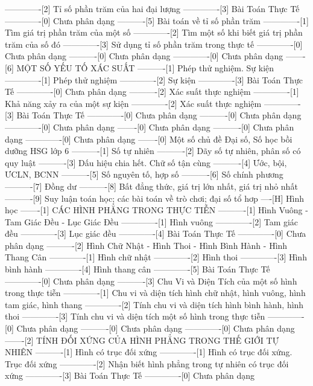 -------------[2] Tỉ số phần trăm của hai đại lượng
-------------[3] Bài Toán Thực Tế
-------------[0] Chưa phân dạng
----------[5] Bài toán về tỉ số phần trăm
-------------[1] Tìm giá trị phần trăm của một số
-------------[2] Tìm một số khi biết giá trị phần trăm của số đó
-------------[3] Sử dụng tỉ số phần trăm trong thực tế
-------------[0] Chưa phân dạng
----------[0] Chưa phân dạng
-------------[0] Chưa phân dạng
-------[6] MỘT SỐ YẾU TỐ XÁC SUẤT
----------[1] Phép thử nghiệm. Sự kiện
-------------[1] Phép thử nghiệm
-------------[2] Sự kiện
-------------[3] Bài Toán Thực Tế
-------------[0] Chưa phân dạng
----------[2] Xác suất thực nghiệm
-------------[1] Khả năng xảy ra của một sự kiện
-------------[2] Xác suất thực nghiệm
-------------[3] Bài Toán Thực Tế
-------------[0] Chưa phân dạng
----------[0] Chưa phân dạng
-------------[0] Chưa phân dạng
-------[0] Chưa phân dạng
----------[0] Chưa phân dạng
-------------[0] Chưa phân dạng
-------[0] Một số chủ đề Đại số, Số học bồi dưỡng HSG lớp 6
----------[1] Số tự nhiên
----------[2] Dãy số tự nhiên, phân số có quy luật
----------[3] Dấu hiệu chia hết. Chữ số tận cùng
----------[4] Ước, bội, ƯCLN, BCNN
----------[5] Số nguyên tố, hợp số
----------[6] Số chính phương
----------[7] Đồng dư
----------[8] Bất đẳng thức, giá trị lớn nhất, giá trị nhỏ nhất
----------[9] Suy luận toán học; các bài toán về trò chơi; đại số tổ hơp
----[H] Hình học
-------[1] CÁC HÌNH PHẲNG TRONG THỰC TIỄN
----------[1] Hình Vuông - Tam Giác Đều - Lục Giác Đều
-------------[1] Hình vuông
-------------[2] Tam giác đều
-------------[3] Lục giác đều
-------------[4] Bài Toán Thực Tế
-------------[0] Chưa phân dạng
----------[2] Hình Chữ Nhật - Hình Thoi - Hình Bình Hành - Hình Thang Cân
-------------[1] Hình chữ nhật
-------------[2] Hình thoi
-------------[3] Hình bình hành
-------------[4] Hình thang cân
-------------[5] Bài Toán Thực Tế
-------------[0] Chưa phân dạng
----------[3] Chu Vi và Diện Tích của một số hình trong thực tiễn
-------------[1] Chu vi và diện tích hình chữ nhật, hình vuông, hình tam giác, hình thang
-------------[2] Tính chu vi và diện tích hình bình hành, hình thoi
-------------[3] Tính chu vi và diện tích một số hình trong thực tiễn
-------------[0] Chưa phân dạng
----------[0] Chưa phân dạng
-------------[0] Chưa phân dạng
-------[2] TÍNH ĐỐI XỨNG CỦA HÌNH PHẲNG TRONG THẾ GIỚI TỰ NHIÊN
----------[1] Hình có trục đối xứng
-------------[1] Hình có trục đối xứng. Trục đối xứng
-------------[2] Nhận biết hình phẳng trong tự nhiên có trục đối xứng
-------------[3] Bài Toán Thực Tế
-------------[0] Chưa phân dạng
